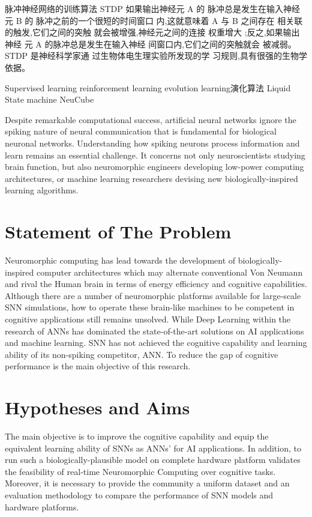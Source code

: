 脉冲神经网络的训练算法
STDP
如果输出神经元 A 的
脉冲总是发生在输入神经元 B 的
脉冲之前的一个很短的时间窗口
内,这就意味着 A 与 B 之间存在 
相关联的触发,它们之间的突触 
就会被增强,神经元之间的连接 
权重增大 ;反之,如果输出神经 
元 A 的脉冲总是发生在输入神经 
间窗口内,它们之间的突触就会 
被减弱。STDP 是神经科学家通
过生物体电生理实验所发现的学
习规则,具有很强的生物学依据。

Supervised learning
reinforcement learning
evolution learning演化算法
Liquid State machine
NeuCube

Despite remarkable computational success, artificial neural networks ignore the spiking nature of neural communication that is fundamental for biological neuronal networks. Understanding how spiking neurons process information and learn remains an essential challenge. It concerns not only neuroscientists studying brain function, but also neuromorphic engineers developing low-power computing architectures, or machine learning researchers devising new biologically-inspired learning algorithms. 





\section{Statement of The Problem}
\label{sec:problem}
Neuromorphic computing has lead towards the development of biologically-inspired computer architectures which may alternate conventional Von Neumann and rival the Human brain in terms of energy efficiency and cognitive capabilities.
Although there are a number of neuromorphic platforms available for large-scale SNN simulations, how to operate these brain-like machines to be competent in cognitive applications still remains unsolved.
While Deep Learning within the research of ANNs has dominated the state-of-the-art solutions on AI applications and machine learning.
SNN has not achieved the cognitive capability and learning ability of its non-spiking competitor, ANN.
To reduce the gap of cognitive performance is the main objective of this research.


\section{Hypotheses and Aims}
\label{sec:aim}
The main objective is to improve the cognitive capability and equip the equivalent learning ability of SNNs as ANNs' for AI applications.
In addition, to run such a biologically-plausible model on complete hardware platform validates the feasibility of real-time Neuromorphic Computing over cognitive tasks.
Moreover, it is necessary to provide the community a uniform dataset and an evaluation methodology to compare the performance of SNN models and hardware platforms.

